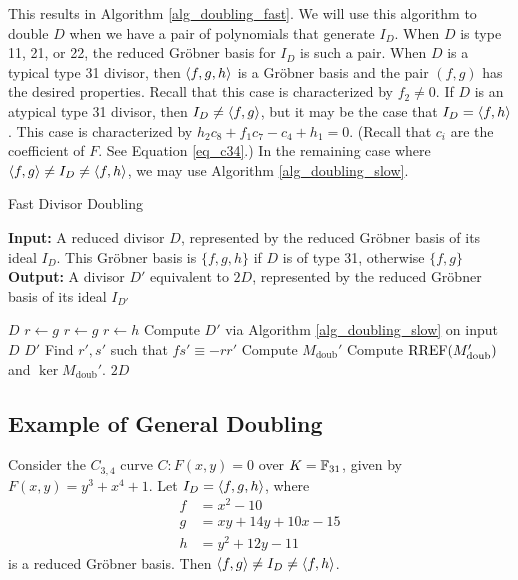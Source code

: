 This results in Algorithm \ref{alg_doubling_fast}.
We will use this algorithm to double $D$
when we have a pair of polynomials that generate $I_D$.
When $D$ is type 11, 21, or 22, the reduced Gr\"obner basis for $I_D$ is such a pair.
When $D$ is a typical type 31 divisor, then $\left\langle f,g,h \right\rangle$ is a Gr\"obner basis
and the pair $(f,g)$ has the desired properties.
Recall that this case is characterized by $f_2 \neq 0$.
If $D$ is an atypical type 31 divisor, then $I_D \neq \left\langle f,g \right\rangle$,
but it may be the case that $I_D = \left\langle f,h \right\rangle$.
This case is characterized by $h_2c_8 + f_1c_7 - c_4 + h_1 = 0$.
(Recall that $c_i$ are the coefficient of $F$. See Equation \ref{eq_c34}.)
In the remaining case where $\left\langle f,g \right\rangle \neq I_D \neq \left\langle f,h \right\rangle$, we may use Algorithm \ref{alg_doubling_slow}.
\begin{algorithm}
  \label{alg_doubling_fast}
  \caption{Fast Divisor Doubling}
  {\bf Input:} A reduced divisor $D$, represented by the reduced Gr\"obner basis of its ideal $I_D$.
  This Gr\"obner basis is $\{f,g,h\}$ if $D$ is of type 31, otherwise $\{f,g\}$ \\
  {\bf Output:} A divisor $D'$ equivalent to $2D$, represented by the reduced Gr\"obner basis of its ideal $I_{D'}$
  \begin{algorithmic}[1]
      \State \Return $D$
      \State $r \gets g$
        \State $r \gets g$
        \State $r \gets h$
      \Else
        \State Compute $D'$ via Algorithm \ref{alg_doubling_slow} on input $D$
        \State \Return $D'$
      \EndIf
    \EndIf
    \State Find $r', s'$ such that $fs' \equiv -rr'$
    \State Compute $M_{\text{doub}}'$
    \State Compute $\operatorname{RREF}(M_{\text{doub}}')$ and $\ker M_{\text{doub}}'$.
    \State \Return $2D$
  \end{algorithmic}
\end{algorithm}




\subsection{Example of General Doubling}

Consider the $C_{3,4}$ curve $C : F(x,y) = 0$ over $K = \mathbb{F}_{31}$,
given by $F(x,y) = y^3 + x^4 + 1$.
Let $I_D = \left\langle f,g,h \right\rangle$, where
\begin{align*}
  f &= x^2 - 10 \\
  g &= xy + 14y + 10x - 15 \\
  h &= y^2 + 12y - 11
\end{align*}
is a reduced Gr\"obner basis.
Then $\left\langle f,g \right\rangle \neq I_D \neq \left\langle f,h \right\rangle$.

